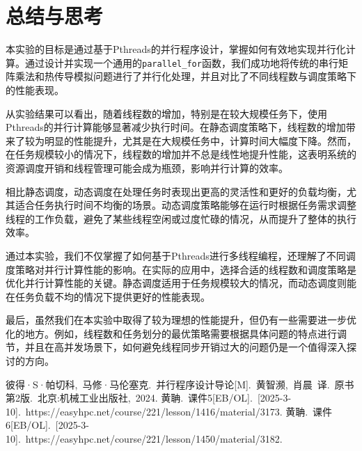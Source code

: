 \documentclass[a4paper, utf8]{ctexart}
\begin{document}
	\section{总结与思考}
	
	本实验的目标是通过基于Pthreads的并行程序设计，掌握如何有效地实现并行化计算。通过设计并实现一个通用的\verb|parallel_for|函数，我们成功地将传统的串行矩阵乘法和热传导模拟问题进行了并行化处理，并且对比了不同线程数与调度策略下的性能表现。
	
	从实验结果可以看出，随着线程数的增加，特别是在较大规模任务下，使用Pthreads的并行计算能够显著减少执行时间。在静态调度策略下，线程数的增加带来了较为明显的性能提升，尤其是在大规模任务中，计算时间大幅度下降。然而，在任务规模较小的情况下，线程数的增加并不总是线性地提升性能，这表明系统的资源调度开销和线程管理可能会成为瓶颈，影响并行计算的效率。
	
	相比静态调度，动态调度在处理任务时表现出更高的灵活性和更好的负载均衡，尤其适合任务执行时间不均衡的场景。动态调度策略能够在运行时根据任务需求调整线程的工作负载，避免了某些线程空闲或过度忙碌的情况，从而提升了整体的执行效率。
	
	通过本实验，我们不仅掌握了如何基于Pthreads进行多线程编程，还理解了不同调度策略对并行计算性能的影响。在实际的应用中，选择合适的线程数和调度策略是优化并行计算性能的关键。静态调度适用于任务规模较大的情况，而动态调度则能在任务负载不均的情况下提供更好的性能表现。
	
	最后，虽然我们在本实验中取得了较为理想的性能提升，但仍有一些需要进一步优化的地方。例如，线程数和任务划分的最优策略需要根据具体问题的特点进行调节，并且在高并发场景下，如何避免线程同步开销过大的问题仍是一个值得深入探讨的方向。
	
	\let\cleardoublepage\clearpage
	
	\begin{thebibliography}{99}  
		 彼得·S·帕切科,\ 马修·马伦塞克.\ 并行程序设计导论[M].\ 黄智濒,\ 肖晨\ 译.\ 原书第2版.\ 北京:机械工业出版社,\ 2024.
		 黄聃.\ 课件5[EB/OL].\ [2025-3-10].\ https://easyhpc.net/course/221/lesson/1416/material/3173.
		 黄聃.\ 课件6[EB/OL].\ [2025-3-10].\ https://easyhpc.net/course/221/lesson/1450/material/3182.
	\end{thebibliography}
	
\end{document}
